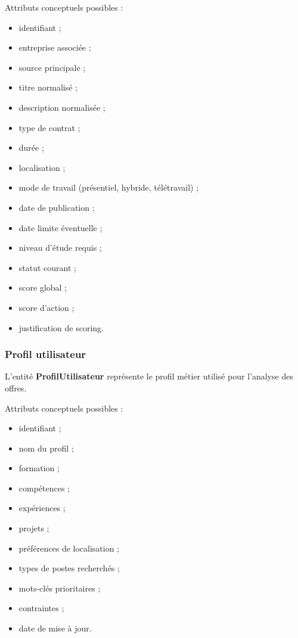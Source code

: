 \documentclass[11pt,a4paper]{article}
\begin{document}
Attributs conceptuels possibles :
\begin{itemize}
    \item identifiant ;
    \item entreprise associée ;
    \item source principale ;
    \item titre normalisé ;
    \item description normalisée ;
    \item type de contrat ;
    \item durée ;
    \item localisation ;
    \item mode de travail (présentiel, hybride, télétravail) ;
    \item date de publication ;
    \item date limite éventuelle ;
    \item niveau d’étude requis ;
    \item statut courant ;
    \item score global ;
    \item score d’action ;
    \item justification de scoring.
\end{itemize}

\subsubsection{Profil utilisateur}

L’entité \textbf{ProfilUtilisateur} représente le profil métier utilisé pour l’analyse des offres.

Attributs conceptuels possibles :
\begin{itemize}
    \item identifiant ;
    \item nom du profil ;
    \item formation ;
    \item compétences ;
    \item expériences ;
    \item projets ;
    \item préférences de localisation ;
    \item types de postes recherchés ;
    \item mots-clés prioritaires ;
    \item contraintes ;
    \item date de mise à jour.
\end{itemize}
\end{document}
